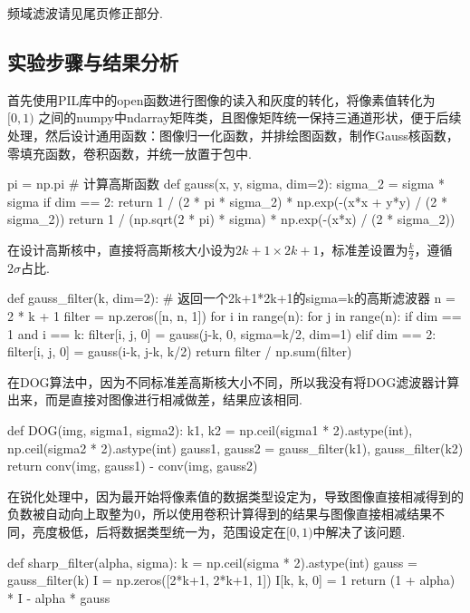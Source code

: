 \documentclass[12pt, a4paper, oneside]{ctexart}
\begin{document}
频域滤波请见尾页修正部分.

\subsection{实验步骤与结果分析}
首先使用PIL库中的open函数进行图像的读入和灰度的转化，将像素值转化为 $[0,1)$ 之间的numpy中ndarray矩阵类，且图像矩阵统一保持三通道形状，便于后续处理，然后设计通用函数：图像归一化函数，并排绘图函数，制作Gauss核函数，零填充函数，卷积函数，并统一放置于包中.
\begin{pythoncode}
pi = np.pi  # 计算高斯函数
def gauss(x, y, sigma, dim=2):
    sigma_2 = sigma * sigma
    if dim == 2:
        return 1 / (2 * pi * sigma_2) * np.exp(-(x*x + y*y) / (2 * sigma_2))
    return 1 / (np.sqrt(2 * pi) * sigma) * np.exp(-(x*x) / (2 * sigma_2))
\end{pythoncode}

在设计高斯核中，直接将高斯核大小设为$2k+1\times 2k+1$，标准差设置为$\frac{k}{2}$，遵循$2\sigma$占比.
\begin{pythoncode}
def gauss_filter(k, dim=2):  # 返回一个2k+1*2k+1的sigma=k的高斯滤波器
n = 2 * k + 1
filter = np.zeros([n, n, 1])
for i in range(n):
    for j in range(n):
        if dim == 1 and i == k:
            filter[i, j, 0] = gauss(j-k, 0, sigma=k/2, dim=1)
        elif dim == 2:
            filter[i, j, 0] = gauss(i-k, j-k, k/2)
return filter / np.sum(filter)
\end{pythoncode}

在DOG算法中，因为不同标准差高斯核大小不同，所以我没有将DOG滤波器计算出来，而是直接对图像进行相减做差，结果应该相同. 
\begin{pythoncode}
def DOG(img, sigma1, sigma2):
    k1, k2 = np.ceil(sigma1 * 2).astype(int), np.ceil(sigma2 * 2).astype(int)
    gauss1, gauss2 = gauss_filter(k1), gauss_filter(k2)
    return conv(img, gauss1) - conv(img, gauss2)
\end{pythoncode}

在锐化处理中，因为最开始将像素值的数据类型设定为，导致图像直接相减得到的负数被自动向上取整为$0$，所以使用卷积计算得到的结果与图像直接相减结果不同，亮度极低，后将数据类型统一为，范围设定在$[0,1)$中解决了该问题.
\begin{pythoncode}
def sharp_filter(alpha, sigma):
    k = np.ceil(sigma * 2).astype(int)
    gauss = gauss_filter(k)
    I = np.zeros([2*k+1, 2*k+1, 1])
    I[k, k, 0] = 1
    return (1 + alpha) * I - alpha * gauss
\end{pythoncode}
\end{document}
